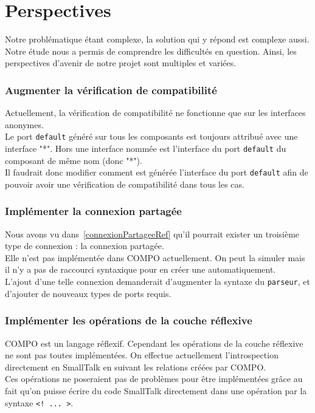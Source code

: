\documentclass[11pt,a4paper,openany,oneside]{book}
\begin{document}
\section{Perspectives}

Notre problématique étant complexe, la solution qui y répond est complexe aussi. Notre étude nous a permis de comprendre les difficultés en question. Ainsi, les perspectives d’avenir de notre projet sont multiples et variées.

\subsubsection{Augmenter la vérification de compatibilité}
Actuellement, la vérification de compatibilité ne fonctionne que sur les interfaces anonymes.\\
Le port \texttt{default} généré sur tous les composants est toujours attribué avec une interface "*". Hors une interface nommée est l'interface du port \texttt{default} du composant de même nom (donc "*").\\
Il faudrait donc modifier comment est générée l'interface du port \texttt{default} afin de pouvoir avoir une vérification de compatibilité dans tous les cas.

\subsubsection{Implémenter la connexion partagée}
Nous avons vu dans~\ref{connexionPartageeRef} qu'il pourrait exister un troisième type de connexion : la connexion partagée.\\
Elle n'est pas implémentée dans COMPO actuellement. On peut la simuler mais il n'y a pas de raccourci syntaxique pour en créer une automatiquement.\\
L'ajout d'une telle connexion demanderait d'augmenter la syntaxe du \texttt{parseur}, et d'ajouter de nouveaux types de ports requis.

\subsubsection{Implémenter les opérations de la couche réflexive}
COMPO est un langage réflexif. Cependant les opérations de la couche réflexive ne sont pas toutes implémentées. On effectue actuellement l'introspection directement en SmallTalk en suivant les relations créées par COMPO.\\
Ces opérations ne poseraient pas de problèmes pour être implémentées grâce au fait qu'on puisse écrire du code SmallTalk directement dans une opération par la syntaxe \texttt{<! ... >}.
\end{document}
